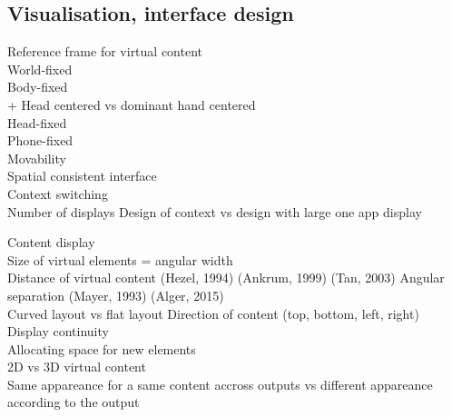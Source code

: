 \subsection*{Visualisation, interface design}
        Reference frame for virtual content \\
            World-fixed \cite{EnsFinneganIrani2014} \\
            Body-fixed \cite{EnsFinneganIrani2014} \\
                + Head centered vs dominant hand centered \\
            Head-fixed \cite{EnsFinneganIrani2014} \\
            Phone-fixed \\
        	Movability \cite{EnsHincapie-RamosIrani2014} \\
            Spatial consistent interface \cite{LiDearmanTruong2009} \\

        Context switching \\
            Number of displays \cite{RashidNacentaQuigley2012} \cite{CauchardLoechtefeldFraserEtAl2012}
            Design of context vs design with large one app display \cite{BallNorth2008}

        Content display \\
            Size of virtual elements = angular width \cite{ShuppBallYostEtAl2006} \cite{BallNorth2008} \\
            Distance of virtual content (Hezel, 1994) (Ankrum, 1999) (Tan, 2003) \cite{ChanKaoChenEtAl2010} \cite{EnsFinneganIrani2014} 
            Angular separation (Mayer, 1993) \cite{EnsFinneganIrani2014} \cite{KishishitaKiyokawaOrloskyEtAl2014} (Alger, 2015) \\ 
            Curved layout vs flat layout \cite{ShuppBallYostEtAl2006} 
            Direction of content (top, bottom, left, right) \cite{EnsFinneganIrani2014} \\
            Display continuity \cite{TanCzerwinski2003} \cite{RashidNacentaQuigley2012} \\
            Allocating space for new elements \cite{BellFeiner2000} \\

            2D vs 3D virtual content \cite{JansenDragicevicFekete2013} \cite{SerranoHildebrandtSubramanianEtAl2014} \\
            Same appareance for a same content accross outputs vs different appareance according to the output \cite{GrubertHeinischQuigleyEtAl2015} \\


